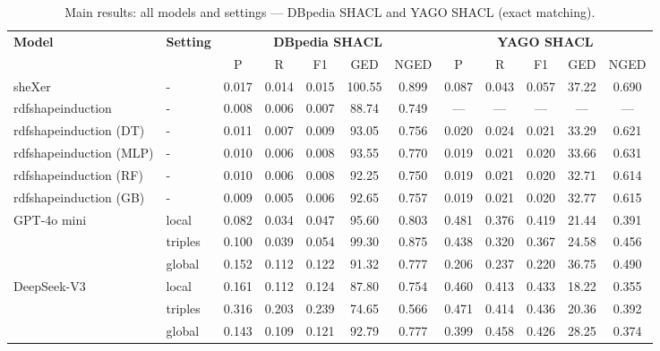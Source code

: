 \begin{table}[h]
\centering
\begin{tabular}{ll|ccccc|ccccc}
\hline
\textbf{Model} & \textbf{Setting} & \multicolumn{5}{c|}{\textbf{DBpedia SHACL}} & \multicolumn{5}{c}{\textbf{YAGO SHACL}} \\
 & & P & R & F1 & GED & NGED & P & R & F1 & GED & NGED \\
\hline
\multirow{1}{*}{sheXer} & - & 0.017 & 0.014 & 0.015 & 100.55 & 0.899 & 0.087 & 0.043 & 0.057 & 37.22 & 0.690 \\
\hline
\multirow{1}{*}{rdfshapeinduction} & - & 0.008 & 0.006 & 0.007 & 88.74 & 0.749 & --- & --- & --- & --- & --- \\
\hline
\multirow{1}{*}{rdfshapeinduction (DT)} & - & 0.011 & 0.007 & 0.009 & 93.05 & 0.756 & 0.020 & 0.024 & 0.021 & 33.29 & 0.621 \\
\hline
\multirow{1}{*}{rdfshapeinduction (MLP)} & - & 0.010 & 0.006 & 0.008 & 93.55 & 0.770 & 0.019 & 0.021 & 0.020 & 33.66 & 0.631 \\
\hline
\multirow{1}{*}{rdfshapeinduction (RF)} & - & 0.010 & 0.006 & 0.008 & 92.25 & 0.750 & 0.019 & 0.021 & 0.020 & 32.71 & 0.614 \\
\hline
\multirow{1}{*}{rdfshapeinduction (GB)} & - & 0.009 & 0.005 & 0.006 & 92.65 & 0.757 & 0.019 & 0.021 & 0.020 & 32.77 & 0.615 \\
\hline
\multirow{3}{*}{GPT-4o mini} & local & 0.082 & 0.034 & 0.047 & 95.60 & 0.803 & 0.481 & 0.376 & 0.419 & 21.44 & 0.391 \\
 & triples & 0.100 & 0.039 & 0.054 & 99.30 & 0.875 & 0.438 & 0.320 & 0.367 & 24.58 & 0.456 \\
 & global & 0.152 & 0.112 & 0.122 & 91.32 & 0.777 & 0.206 & 0.237 & 0.220 & 36.75 & 0.490 \\
\hline
\multirow{3}{*}{DeepSeek-V3} & local & 0.161 & 0.112 & 0.124 & 87.80 & 0.754 & 0.460 & 0.413 & 0.433 & 18.22 & 0.355 \\
 & triples & 0.316 & 0.203 & 0.239 & 74.65 & 0.566 & 0.471 & 0.414 & 0.436 & 20.36 & 0.392 \\
 & global & 0.143 & 0.109 & 0.121 & 92.79 & 0.777 & 0.399 & 0.458 & 0.426 & 28.25 & 0.374 \\
\hline
\end{tabular}
\caption{Main results: all models and settings — DBpedia SHACL and YAGO SHACL (exact matching).}
\label{tab:t3-main-results}
\end{table}
